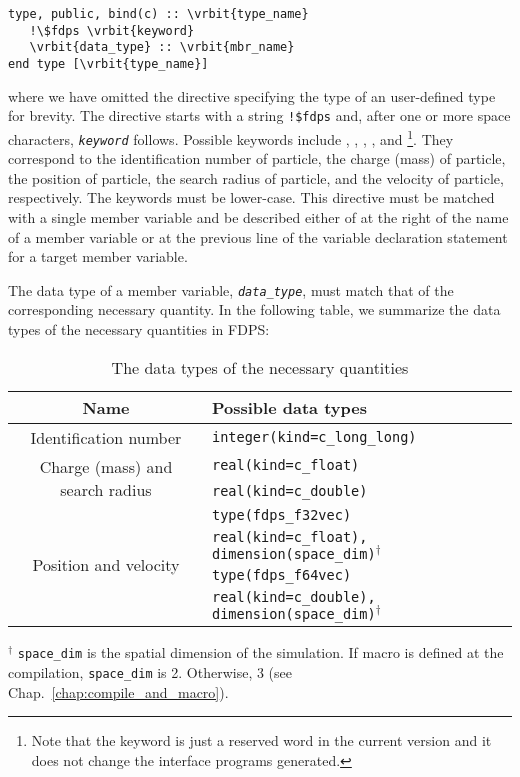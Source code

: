 \begin{screen}
\begin{Verbatim}[commandchars=\\\{\}]
type, public, bind(c) :: \vrbit{type_name}
   !\$fdps \vrbit{keyword}
   \vrbit{data_type} :: \vrbit{mbr_name} 
end type [\vrbit{type_name}]
\end{Verbatim}
\end{screen}
where we have omitted the directive specifying the type of an user-defined type for brevity. The directive starts with a string \verb|!$fdps| and, after one or more space characters, \textit{\texttt{keyword}} follows. Possible keywords include , , , , and  \footnote{Note that the keyword  is just a reserved word in the current version and it does not change the interface programs generated.}. They correspond to the identification number of particle, the charge (mass) of particle, the position of particle, the search radius of particle, and the velocity of particle, respectively. The keywords must be lower-case. This directive must be matched with a single member variable and be described either of at the right of the name of a member variable or at the previous line of the variable declaration statement for a target member variable. 

The data type of a member variable, \textit{\texttt{data\_type}}, must match that of the corresponding necessary quantity. In the following table, we summarize the data types of the necessary quantities in FDPS:
\begin{table}[H]
\begin{tabularx}{\linewidth}{cX}
\toprule
\rowcolor{Snow2}
Name & Possible data types \\
\midrule
Identification number & \texttt{integer(kind=c\_long\_long)} \\
\midrule
\multirow{2}{*}{Charge (mass) and search radius} & \texttt{real(kind=c\_float)} \\
 & \texttt{real(kind=c\_double)} \\
\midrule
\multirow{4}{*}{Position and velocity} & \texttt{type(fdps\_f32vec)} \\
& \texttt{real(kind=c\_float), dimension(space\_dim)}$^{\dagger}$ \\
& \texttt{type(fdps\_f64vec)} \\
& \texttt{real(kind=c\_double), dimension(space\_dim)}$^{\dagger}$ \\
\bottomrule
\end{tabularx}
\begin{flushleft}
$^{\dagger}$ \texttt{space\_dim} is the spatial dimension of the simulation. If macro  is defined at the compilation, \texttt{space\_dim} is 2. Otherwise, 3 (see Chap.~\ref{chap:compile_and_macro}).
\end{flushleft}
\caption{The data types of the necessary quantities}
\end{table}

